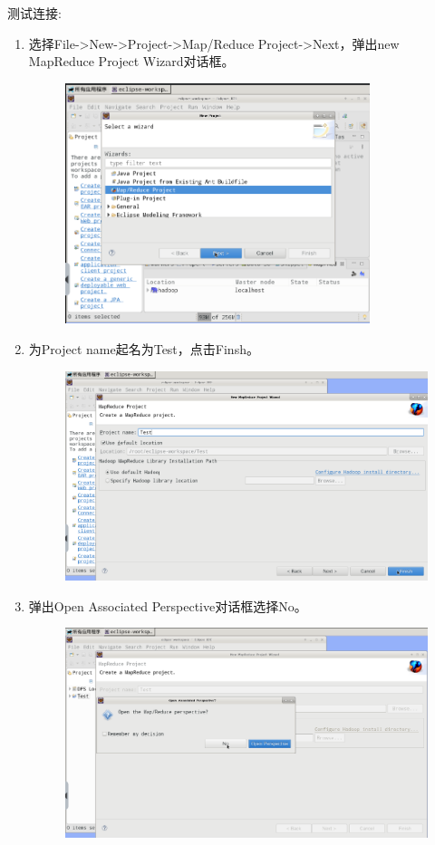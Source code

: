 \documentclass {article}
\begin{document}
				测试连接:
				\begin{enumerate}
					\item 选择File->New->Project->Map/Reduce Project->Next，弹出new MapReduce Project Wizard对话框。
					\begin{figure}[H]
						\centering
						\includegraphics[width=3.5in]{figures/fig8.png}
					\end{figure}
				
					\item 为Project name起名为Test，点击Finsh。
					\begin{figure}[H]
						\centering
						\includegraphics[width=4.5in]{figures/fig9.png}
					\end{figure}
				
					\item 弹出Open Associated Perspective对话框选择No。
					\begin{figure}[H]
						\centering
						\includegraphics[width=4.5in]{figures/fig10.png}
					\end{figure}
				

\end{enumerate}
\end{document}
